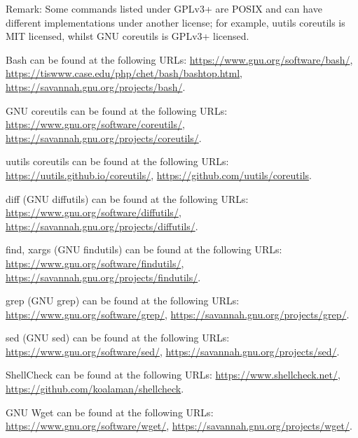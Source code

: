 \documentclass{article}
\begin{document}
Remark: Some commands listed under GPLv3+ are POSIX
and can have different implementations under another license;
for example, uutils coreutils is MIT licensed,
whilst GNU coreutils is GPLv3+ licensed.

Bash can be found at the following URLs:\newline
\url{https://www.gnu.org/software/bash/},\newline
\url{https://tiswww.case.edu/php/chet/bash/bashtop.html},\newline
\url{https://savannah.gnu.org/projects/bash/}.

GNU coreutils can be found at the following URLs:\newline
\url{https://www.gnu.org/software/coreutils/},\newline
\url{https://savannah.gnu.org/projects/coreutils/}.

uutils coreutils can be found at the following URLs:\newline
\url{https://uutils.github.io/coreutils/},\newline
\url{https://github.com/uutils/coreutils}.

diff (GNU diffutils) can be found at the following URLs:\newline
\url{https://www.gnu.org/software/diffutils/},\newline
\url{https://savannah.gnu.org/projects/diffutils/}.

find, xargs (GNU findutils) can be found at the following URLs:\newline
\url{https://www.gnu.org/software/findutils/},\newline
\url{https://savannah.gnu.org/projects/findutils/}.

grep (GNU grep) can be found at the following URLs:\newline
\url{https://www.gnu.org/software/grep/},\newline
\url{https://savannah.gnu.org/projects/grep/}.

sed (GNU sed) can be found at the following URLs:\newline
\url{https://www.gnu.org/software/sed/},\newline
\url{https://savannah.gnu.org/projects/sed/}.

ShellCheck can be found at the following URLs:\newline
\url{https://www.shellcheck.net/},\newline
\url{https://github.com/koalaman/shellcheck}.

GNU Wget can be found at the following URLs:\newline
\url{https://www.gnu.org/software/wget/},\newline
\url{https://savannah.gnu.org/projects/wget/}.
\end{document}
